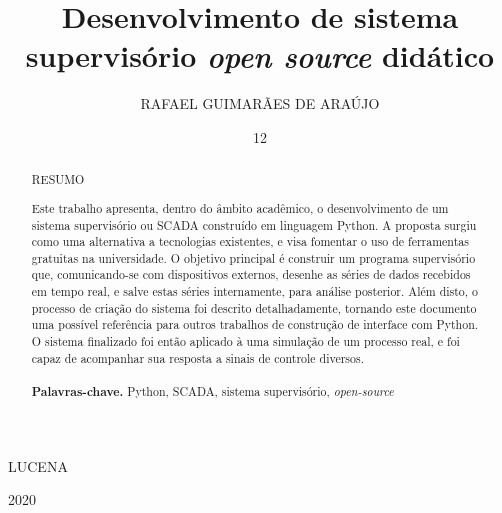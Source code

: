 \documentclass[msc]{pei}
\theoremstyle{definition}
\begin{document}
	\title{Desenvolvimento de sistema supervisório \emph{open source} didático}
	\author{RAFAEL GUIMARÃES DE ARAÚJO}{LUCENA}
	\date{12}{2020}
	
	
	\maketitle
	
	\frontmatter
	
	
	
	
	
	
	
	
	
	\begin{abstract}
		
		\begin{center}
			RESUMO
		\end{center}
		
		\vspace*{5mm}
		
		\noindent Este trabalho apresenta, dentro do âmbito acadêmico, o desenvolvimento de um sistema supervisório ou SCADA construído em linguagem Python. A proposta surgiu como uma alternativa a tecnologias existentes, e visa fomentar o uso de ferramentas gratuitas na universidade. O objetivo principal é construir um programa supervisório que, comunicando-se com dispositivos externos, desenhe as séries de dados recebidos em tempo real, e salve estas séries internamente, para análise posterior. Além disto, o processo de criação do sistema foi descrito detalhadamente, tornando este documento uma possível referência para outros trabalhos de construção de interface com Python. O sistema finalizado foi então aplicado à uma simulação de um processo real, e foi capaz de acompanhar sua resposta a sinais de controle diversos.
		\\\\
		\noindent \textbf{Palavras-chave.} Python, SCADA, sistema supervisório, \textit{open-source}
		
	\end{abstract}
	
\end{document}
